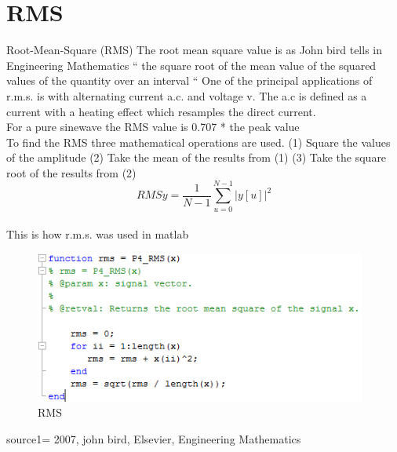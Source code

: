 \section{RMS}
Root-Mean-Square (RMS)
The root mean square value is as John bird tells in Engineering Mathematics \cite{Bird2007
} “ the square root of the mean value of the squared values of the quantity over an interval “
One of the principal applications of r.m.s. is with alternating current a.c. and voltage v. The a.c is defined as a current with a heating effect which resamples the direct current. \cite{Bird2007}
\\
For a pure sinewave the RMS value is 0.707 * the peak value
\\
To find the RMS three mathematical operations are used.
(1)	Square the values of the amplitude
(2)	Take the mean of the results from (1)
(3)	Take the square root of the results from (2)
\begin{equation}\label{eq:RMS formular}
RMSy = \frac{1}{N-1}\sum_{u=0}^{N-1}|y[u]|^2
\end{equation}
\\
This is how r.m.s. was used in matlab
\begin{figure}
\begin{center}
\includegraphics[height=5cm]{fig/RMS_matlabCode.png}
\caption{RMS}
\end{center}
\end{figure}

source1= 2007, john bird, Elsevier, Engineering Mathematics
